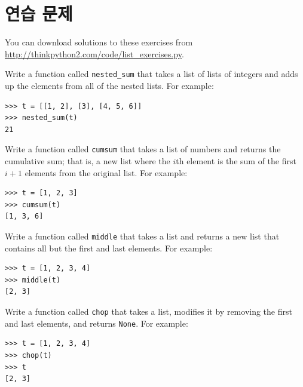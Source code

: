 \documentclass[10pt]{book}
\begin{document}
\section{연습 문제}

You can download solutions to these exercises from
\url{http://thinkpython2.com/code/list_exercises.py}.

\begin{exercise}

Write a function called \verb"nested_sum" that takes a list of lists
of integers and adds up the elements from all of the nested lists.
For example:

\begin{verbatim}
>>> t = [[1, 2], [3], [4, 5, 6]]
>>> nested_sum(t)
21
\end{verbatim}

\end{exercise}

\begin{exercise}
\label{cumulative}

Write a function called {\tt cumsum} that takes a list of numbers and
returns the cumulative sum; that is, a new list where the $i$th
element is the sum of the first $i+1$ elements from the original list.
For example:

\begin{verbatim}
>>> t = [1, 2, 3]
>>> cumsum(t)
[1, 3, 6]
\end{verbatim}

\end{exercise}

\begin{exercise}

Write a function called \verb"middle" that takes a list and
returns a new list that contains all but the first and last
elements.  For example:

\begin{verbatim}
>>> t = [1, 2, 3, 4]
>>> middle(t)
[2, 3]
\end{verbatim}

\end{exercise}

\begin{exercise}

Write a function called \verb"chop" that takes a list, modifies it
by removing the first and last elements, and returns {\tt None}.
For example:

\begin{verbatim}
>>> t = [1, 2, 3, 4]
>>> chop(t)
>>> t
[2, 3]
\end{verbatim}

\end{exercise}
\end{document}
